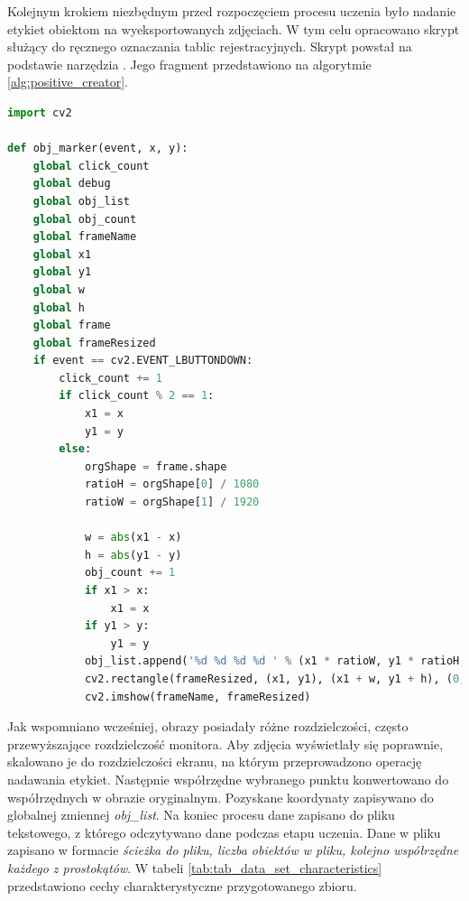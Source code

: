 Kolejnym krokiem niezbędnym przed rozpoczęciem procesu uczenia było nadanie etykiet obiektom na wyeksportowanych zdjęciach.
W tym celu opracowano skrypt służący do ręcznego oznaczania tablic rejestracyjnych.
Skrypt powstał na podstawie narzędzia \cite{haar_object_marker}.
Jego fragment przedstawiono na algorytmie \ref{alg:positive_creator}.
\begin{lstlisting}[language=Python, caption=Funkcja do oznaczania fragmentów obrazu zawierających poszukiwany obiekt, label=alg:positive_creator]
import cv2

def obj_marker(event, x, y):
    global click_count
    global debug
    global obj_list
    global obj_count
    global frameName
    global x1
    global y1
    global w
    global h
    global frame
    global frameResized
    if event == cv2.EVENT_LBUTTONDOWN:
        click_count += 1
        if click_count % 2 == 1:
            x1 = x
            y1 = y
        else:
            orgShape = frame.shape
            ratioH = orgShape[0] / 1080
            ratioW = orgShape[1] / 1920

            w = abs(x1 - x)
            h = abs(y1 - y)
            obj_count += 1
            if x1 > x:
                x1 = x
            if y1 > y:
                y1 = y
            obj_list.append('%d %d %d %d ' % (x1 * ratioW, y1 * ratioH, w * ratioW, h * ratioH))
            cv2.rectangle(frameResized, (x1, y1), (x1 + w, y1 + h), (0, 255, 0), 1)
            cv2.imshow(frameName, frameResized)
\end{lstlisting}
Jak wspomniano wcześniej, obrazy posiadały różne rozdzielczości, często przewyższające rozdzielczość monitora.
Aby zdjęcia wyświetlały się poprawnie, skalowano je do rozdzielczości ekranu, na którym przeprowadzono operację nadawania etykiet.
Następnie współrzędne wybranego punktu konwertowano do współrzędnych w obrazie oryginalnym.
Pozyskane koordynaty zapisywano do globalnej zmiennej \textit{obj\_list}.
Na koniec procesu dane zapisano do pliku tekstowego, z którego odczytywano dane podczas etapu uczenia.
Dane w pliku zapisano w formacie \textit{ścieżka do pliku, liczba obiektów w pliku, kolejno współrzędne każdego z prostokątów}.
W tabeli \ref{tab:tab_data_set_characteristics} przedstawiono cechy charakterystyczne przygotowanego zbioru.
